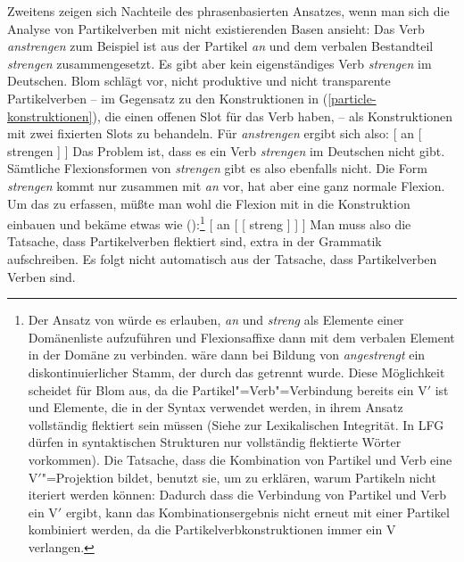Zweitens zeigen sich Nachteile des phrasenbasierten Ansatzes, wenn man sich
die Analyse von Partikelverben mit nicht existierenden Basen ansieht:
Das Verb \emph{anstrengen} zum Beispiel ist aus der Partikel \emph{an}
und dem verbalen Bestandteil \emph{strengen} zusammengesetzt. Es gibt
aber kein eigenständiges Verb \emph{strengen} im Deutschen. Blom
schlägt vor, nicht produktive und nicht transparente Partikelverben
-- im Gegensatz zu den Konstruktionen in (\ref{particle-konstruktionen}),
die einen offenen Slot für das Verb haben, -- als Konstruktionen mit zwei
fixierten Slots zu behandeln. Für \emph{anstrengen} ergibt sich also:
\ea 
{}[ an   [ strengen ] ]
\z
Das Problem ist, dass es ein Verb \emph{strengen} im Deutschen nicht gibt.
Sämtliche Flexionsformen von \emph{strengen} gibt es also ebenfalls nicht.
Die Form \emph{strengen} kommt nur zusammen mit \emph{an} vor, hat aber eine
ganz normale Flexion. Um das zu erfassen, müßte man wohl die Flexion mit in
die Konstruktion einbauen und bekäme etwas wie ():\footnote{
  Der Ansatz von \citet{Crysmann2002a} würde es erlauben, \emph{an} und
  \emph{streng} als Elemente einer Domänenliste aufzuführen und Flexionsaffixe
  dann mit dem verbalen Element in der Domäne zu verbinden. 
  wäre dann bei Bildung von \emph{angestrengt} ein diskontinuierlicher
  Stamm, der durch das  getrennt wurde. Diese Möglichkeit scheidet
  für Blom aus, da die Partikel"=Verb"=Verbindung bereits ein V$'$ ist
  und Elemente, die in der Syntax verwendet werden, in ihrem Ansatz
  vollständig flektiert sein müssen (Siehe  zur Lexikalischen
  Integrität. In LFG dürfen in syntaktischen Strukturen nur vollständig flektierte Wörter vorkommen). 
  Die Tatsache, dass die Kombination von Partikel und Verb eine V$'$"=Projektion bildet, benutzt sie, um zu
  erklären, warum Partikeln nicht iteriert werden können: Dadurch dass
  die Verbindung von Partikel und Verb ein V$'$ ergibt, kann das Kombinationsergebnis
  nicht erneut mit einer Partikel kombiniert werden, da die Partikelverbkonstruktionen
  immer ein V verlangen.%
}
\ea 
{}[ an   [ [ streng ] ] ]
\z
Man muss also die Tatsache, dass Partikelverben flektiert sind, extra in der Grammatik
aufschreiben. Es folgt nicht automatisch aus der Tatsache, dass Partikelverben Verben sind.

